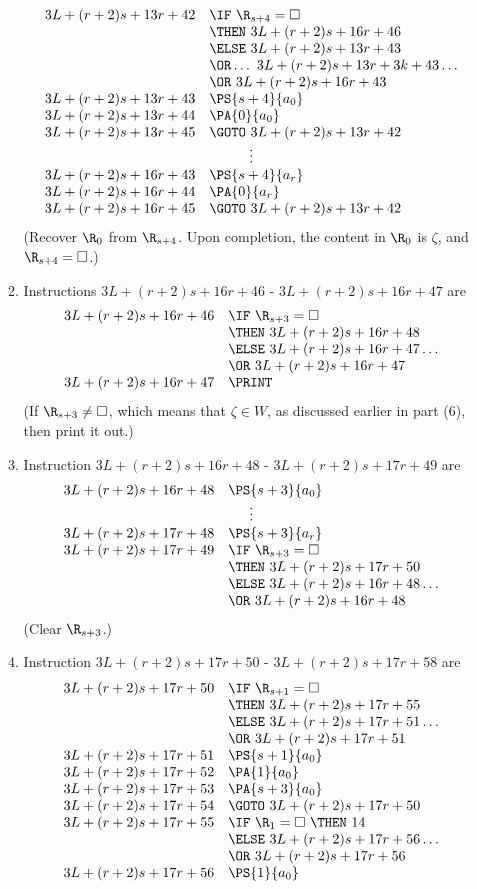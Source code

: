 \begin{enumerate}[1.]
\begin{enumerate}[(1)]
\[\begin{array}{rl}
3L + (r + 2)s + 13r + 42 & \IF \ \R_{s + 4} = \Box \cr
\ & \THEN \ 3L + (r + 2)s + 16r + 46 \cr
\ & \ELSE \ 3L + (r + 2)s + 13r + 43 \cr
\ & \OR \ldots \ 3L + (r + 2)s + 13r + 3k + 43 \ldots \cr
\ & \OR \ 3L + (r + 2)s + 16r + 43 \cr
3L + (r + 2)s + 13r + 43 & \PS{s + 4}{a_0} \cr
3L + (r + 2)s + 13r + 44 & \PA{0}{a_0} \cr
3L + (r + 2)s + 13r + 45 & \GOTO \ 3L + (r + 2)s + 13r + 42 \cr
\multicolumn{2}{c}{\vdots} \cr
3L + (r + 2)s + 16r + 43 & \PS{s + 4}{a_r} \cr
3L + (r + 2)s + 16r + 44 & \PA{0}{a_r} \cr
3L + (r + 2)s + 16r + 45 & \GOTO \ 3L + (r + 2)s + 13r + 42 \cr
\end{array}
\]
(Recover $\R_0$ from $\R_{s + 4}$. Upon completion, the content in $\R_0$ is $\zeta$, and $\R_{s + 4} = \Box$.)
\item Instructions $3L + (r + 2)s + 16r + 46$ - $3L + (r + 2)s + 16r + 47$ are
\[
\begin{array}{rl}
3L + (r + 2)s + 16r + 46 & \IF \ \R_{s + 3} = \Box \cr
\ & \THEN \ 3L + (r + 2)s + 16r + 48 \cr
\ & \ELSE \ 3L + (r + 2)s + 16r + 47 \ldots \cr
\ & \OR \ 3L + (r + 2)s + 16r + 47 \cr
3L + (r + 2)s + 16r + 47 & \PRINT
\end{array}
\]
(If $\R_{s + 3} \neq \Box$, which means that $\zeta \in W$, as discussed earlier in part (6), then print it out.)
\item Instruction $3L + (r + 2)s + 16r + 48$ - $3L + (r + 2)s + 17r + 49$ are
\[
\begin{array}{rl}
3L + (r + 2)s + 16r + 48 & \PS{s + 3}{a_0} \cr
\multicolumn{2}{c}{\vdots} \cr
3L + (r + 2)s + 17r + 48 & \PS{s + 3}{a_r} \cr
3L + (r + 2)s + 17r + 49 & \IF \ \R_{s + 3} = \Box \cr
\ & \THEN \ 3L + (r + 2)s + 17r + 50 \cr
\ & \ELSE \ 3L + (r + 2)s + 16r + 48 \ldots \cr
\ & \OR \ 3L + (r + 2)s + 16r + 48
\end{array}
\]
(Clear $\R_{s + 3}$.)
\item Instruction $3L + (r + 2)s + 17r + 50$ - $3L + (r + 2)s + 17r + 58$ are
\[
\begin{array}{rl}
3L + (r + 2)s + 17r + 50 & \IF \ \R_{s + 1} = \Box \cr
\ & \THEN \ 3L + (r + 2)s + 17r + 55 \cr
\ & \ELSE \ 3L + (r + 2)s + 17r + 51 \ldots \cr
\ & \OR \ 3L + (r + 2)s + 17r + 51 \cr
3L + (r + 2)s + 17r + 51 & \PS{s + 1}{a_0} \cr
3L + (r + 2)s + 17r + 52 & \PA{1}{a_0} \cr
3L + (r + 2)s + 17r + 53 & \PA{s + 3}{a_0} \cr
3L + (r + 2)s + 17r + 54 & \GOTO \ 3L + (r + 2)s + 17r + 50 \cr
3L + (r + 2)s + 17r + 55 & \IF \ \R_1 = \Box \ \THEN \ 14 \cr
\ & \ELSE \ 3L + (r + 2)s + 17r + 56 \ldots \cr
\ & \OR \ 3L + (r + 2)s + 17r + 56 \cr
3L + (r + 2)s + 17r + 56 & \PS{1}{a_0} \cr

\end{array}\]
\end{enumerate}
\end{enumerate}
